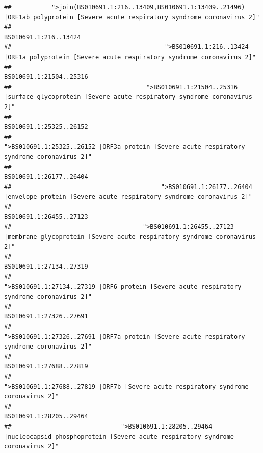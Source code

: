 \documentclass[
]{article}
\begin{document}
\begin{verbatim}
##           ">join(BS010691.1:216..13409,BS010691.1:13409..21496) |ORF1ab polyprotein [Severe acute respiratory syndrome coronavirus 2]" 
##                                                                                                                  BS010691.1:216..13424 
##                                          ">BS010691.1:216..13424 |ORF1a polyprotein [Severe acute respiratory syndrome coronavirus 2]" 
##                                                                                                                BS010691.1:21504..25316 
##                                     ">BS010691.1:21504..25316 |surface glycoprotein [Severe acute respiratory syndrome coronavirus 2]" 
##                                                                                                                BS010691.1:25325..26152 
##                                            ">BS010691.1:25325..26152 |ORF3a protein [Severe acute respiratory syndrome coronavirus 2]" 
##                                                                                                                BS010691.1:26177..26404 
##                                         ">BS010691.1:26177..26404 |envelope protein [Severe acute respiratory syndrome coronavirus 2]" 
##                                                                                                                BS010691.1:26455..27123 
##                                    ">BS010691.1:26455..27123 |membrane glycoprotein [Severe acute respiratory syndrome coronavirus 2]" 
##                                                                                                                BS010691.1:27134..27319 
##                                             ">BS010691.1:27134..27319 |ORF6 protein [Severe acute respiratory syndrome coronavirus 2]" 
##                                                                                                                BS010691.1:27326..27691 
##                                            ">BS010691.1:27326..27691 |ORF7a protein [Severe acute respiratory syndrome coronavirus 2]" 
##                                                                                                                BS010691.1:27688..27819 
##                                                    ">BS010691.1:27688..27819 |ORF7b [Severe acute respiratory syndrome coronavirus 2]" 
##                                                                                                                BS010691.1:28205..29464 
##                              ">BS010691.1:28205..29464 |nucleocapsid phosphoprotein [Severe acute respiratory syndrome coronavirus 2]" 

\end{verbatim}
\end{document}
